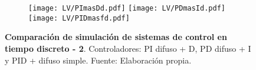     \begin{figure}[htb]
        \centering
        \begin{subfigure}[t]{0.99\textwidth}
            \centering
            \texttt{[image: LV/PImasDd.pdf]}
            \texttt{[image: LV/PDmasId.pdf]}
            \texttt{[image: LV/PIDmasfd.pdf]}
            \label{fig:simD2}
        \end{subfigure}
        \caption[Comparación de simulación de sistemas de control discretos - 2]{\textbf{Comparación de simulación de sistemas de control en tiempo discreto - 2}. Controladores: PI difuso + D, PD difuso + I y PID + difuso simple. Fuente: Elaboración propia. \label{fig:simD2f}}
    \end{figure}